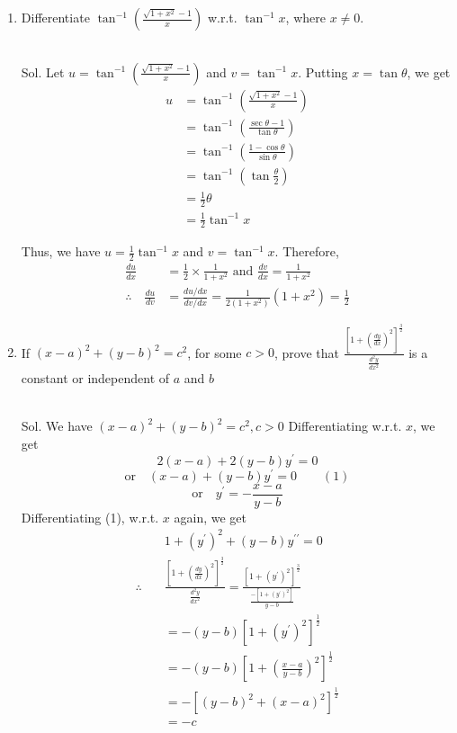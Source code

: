 \begin{enumerate}
\item Differentiate $\tan ^{-1}\left(\frac{\sqrt{1+x^2}-1}{x}\right)$ w.r.t. $\tan ^{-1} x$, where $x \neq 0$.\\\\


\begin{outline}
    Sol. Let $u=\tan ^{-1}\left(\frac{\sqrt{1+x^2}-1}{x}\right)$ and $v=\tan ^{-1} x$.
Putting $x=\tan \theta$, we get
$$
\begin{aligned}
u & =\tan ^{-1}\left(\frac{\sqrt{1+x^2}-1}{x}\right) \\
& =\tan ^{-1}\left(\frac{\sec \theta-1}{\tan \theta}\right) \\
& =\tan ^{-1}\left(\frac{1-\cos \theta}{\sin \theta}\right) \\
& =\tan ^{-1}\left(\tan \frac{\theta}{2}\right) \\
& =\frac{1}{2} \theta \\
& =\frac{1}{2} \tan ^{-1} x
\end{aligned}
$$

Thus, we have $u=\frac{1}{2} \tan ^{-1} x$ and $v=\tan ^{-1} x$. Therefore,
$$
\begin{aligned}
\frac{d u}{d x} & =\frac{1}{2} \times \frac{1}{1+x^2} \text { and } \frac{d v}{d x}=\frac{1}{1+x^2} \\
\therefore \quad \frac{d u}{d v} & =\frac{d u / d x}{d v / d x}=\frac{1}{2\left(1+x^2\right)}\left(1+x^2\right)=\frac{1}{2}
\end{aligned}
$$
\end{outline}


\item If $(x-a)^2+(y-b)^2=c^2$, for some $c>0$, prove that $\frac{\left[1+\left(\frac{d y}{d x}\right)^2\right]^{\frac{3}{2}}}{\frac{d^2 y}{d x^2}}$ is a constant or independent of $a$ and $b$ \\\\

\begin{outline}
    Sol. We have $(x-a)^2+(y-b)^2=c^2, c>0$
Differentiating w.r.t. $x$, we get
$$2(x-a)+2(y-b) y^{\prime}=0$$ $$ \text{or}\quad(x-a)+(y-b) y^{\prime}=0 \quad \quad (1)$$
$$\text{or} \quad y^{\prime}=-\frac{x-a}{y-b}$$
Differentiating (1), w.r.t. $x$ again, we get
$$
\begin{aligned}
& 1+\left(y^{\prime}\right)^2+(y-b) y^{\prime \prime}=0 \\
\therefore \quad & \frac{\left[1+\left(\frac{d y}{d x}\right)^2\right]^{\frac{3}{2}}}{\frac{d^2 y}{d x^2}}=\frac{\left[1+\left(y^{\prime}\right)^2\right]^{\frac{3}{2}}}{\frac{-\left[1+\left(y^{\prime}\right)^2\right]}{y-b}} \\
& =-(y-b)\left[1+\left(y^{\prime}\right)^2\right]^{\frac{1}{2}} \\
& =-(y-b)\left[1+\left(\frac{x-a}{y-b}\right)^2\right]^{\frac{1}{2}} \\
& =-\left[(y-b)^2+(x-a)^2\right]^{\frac{1}{2}} \\
& =-c
\end{aligned}
$$


\end{outline}
\end{enumerate}
